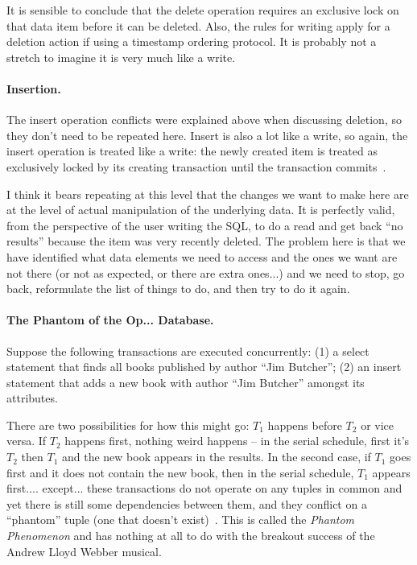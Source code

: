 It is sensible to conclude that the delete operation requires an exclusive lock on that data item before it can be deleted. Also, the rules for writing apply for a deletion action if using a timestamp ordering protocol. It is probably not a stretch to imagine it is very much like a write.

\paragraph{Insertion.} The insert operation conflicts were explained above when discussing deletion, so they don't need to be repeated here. Insert is also a lot like a write, so again, the insert operation is treated like a write: the newly created item is treated as exclusively locked by its creating transaction until the transaction commits~\cite{dsc}.

I think it bears repeating at this level that the changes we want to make here are at the level of actual manipulation of the underlying data. It is perfectly valid, from the perspective of the user writing the SQL, to do a read and get back ``no results'' because the item was very recently deleted. The problem here is that we have identified what data elements we need to access and the ones we want are not there (or not as expected, or there are extra ones...) and we need to stop, go back, reformulate the list of things to do, and then try to do it again. 

\paragraph{The Phantom of the Op... Database.} Suppose the following transactions are executed concurrently: (1) a select statement that finds all books published by author ``Jim Butcher''; (2) an insert statement that adds a new book with author ``Jim Butcher'' amongst its attributes. 

There are two possibilities for how this might go: $T_{1}$ happens before $T_{2}$ or vice versa. If $T_{2}$ happens first, nothing weird happens -- in the serial schedule, first it's $T_{2}$ then $T_{1}$ and the new book appears in the results. In the second case, if $T_{1}$ goes first and it does not contain the new book, then in the serial schedule, $T_{1}$ appears first.... except... these transactions do not operate on any tuples in common and yet there is still some dependencies between them, and they conflict on a ``phantom'' tuple (one that doesn't exist)~\cite{dsc}. This is called the \textit{Phantom Phenomenon} and has nothing at all to do with the breakout success of the Andrew Lloyd Webber musical. 

